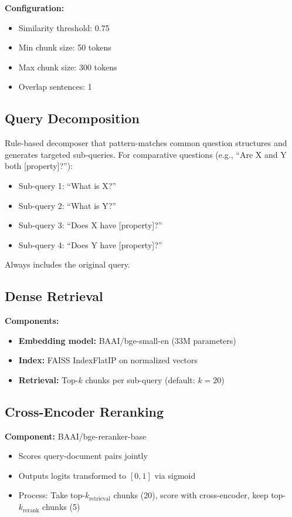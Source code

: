 \documentclass[twocolumn,11pt]{article}
\begin{document}
\textbf{Configuration:}
\begin{itemize}
\item Similarity threshold: 0.75
\item Min chunk size: 50 tokens
\item Max chunk size: 300 tokens
\item Overlap sentences: 1
\end{itemize}

\subsection{Query Decomposition}

Rule-based decomposer that pattern-matches common question structures and generates targeted sub-queries. For comparative questions (e.g., ``Are X and Y both [property]?''):
\begin{itemize}
\item Sub-query 1: ``What is X?''
\item Sub-query 2: ``What is Y?''
\item Sub-query 3: ``Does X have [property]?''
\item Sub-query 4: ``Does Y have [property]?''
\end{itemize}

Always includes the original query.

\subsection{Dense Retrieval}

\textbf{Components:}
\begin{itemize}
\item \textbf{Embedding model:} BAAI/bge-small-en (33M parameters)
\item \textbf{Index:} FAISS IndexFlatIP on normalized vectors
\item \textbf{Retrieval:} Top-$k$ chunks per sub-query (default: $k=20$)
\end{itemize}

\subsection{Cross-Encoder Reranking}

\textbf{Component:} BAAI/bge-reranker-base
\begin{itemize}
\item Scores query-document pairs jointly
\item Outputs logits transformed to $[0, 1]$ via sigmoid
\item Process: Take top-$k_{\text{retrieval}}$ chunks (20), score with cross-encoder, keep top-$k_{\text{rerank}}$ chunks (5)
\end{itemize}
\end{document}

